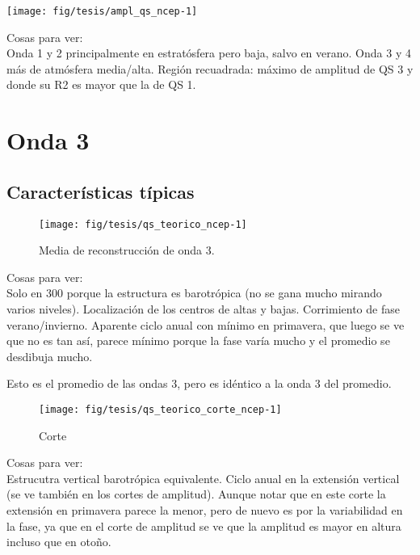 \documentclass[es-AR,]{tufte-book}
\begin{document}
\begin{center}\texttt{[image: fig/tesis/ampl\_qs\_ncep-1]} \end{center}

Cosas para ver:\\
Onda 1 y 2 principalmente en estratósfera pero baja, salvo en verano.
Onda 3 y 4 más de atmósfera media/alta. Región recuadrada: máximo de
amplitud de QS 3 y donde su R2 es mayor que la de QS 1.

\chapter{Onda 3}\label{onda-3}

\section{Características típicas}\label{caracteristicas-tipicas}

\begin{figure}

{\centering \texttt{[image: fig/tesis/qs\_teorico\_ncep-1]} 

}

\caption[Media de reconstrucción de onda 3]{Media de reconstrucción de onda 3.}\label{fig:qs_teorico_ncep}
\end{figure}

Cosas para ver:\\
Solo en 300 porque la estructura es barotrópica (no se gana mucho
mirando varios niveles). Localización de los centros de altas y bajas.
Corrimiento de fase verano/invierno. Aparente ciclo anual con mínimo en
primavera, que luego se ve que no es tan así, parece mínimo porque la
fase varía mucho y el promedio se desdibuja mucho.

Esto es el promedio de las ondas 3, pero es idéntico a la onda 3 del
promedio.

\begin{figure}

{\centering \texttt{[image: fig/tesis/qs\_teorico\_corte\_ncep-1]} 

}

\caption[Corte]{Corte}\label{fig:qs_teorico_corte_ncep}
\end{figure}

Cosas para ver:\\
Estrucutra vertical barotrópica equivalente. Ciclo anual en la extensión
vertical (se ve también en los cortes de amplitud). Aunque notar que en
este corte la extensión en primavera parece la menor, pero de nuevo es
por la variabilidad en la fase, ya que en el corte de amplitud se ve que
la amplitud es mayor en altura incluso que en otoño.
\end{document}
